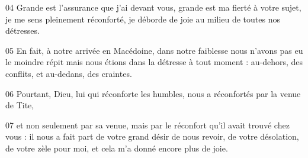 
04 Grande est l’assurance que j’ai devant vous, grande est ma fierté à votre sujet, je me sens pleinement réconforté, je déborde de joie au milieu de toutes nos détresses.

05 En fait, à notre arrivée en Macédoine, dans notre faiblesse nous n’avons pas eu le moindre répit mais nous étions dans la détresse à tout moment : au-dehors, des conflits, et au-dedans, des craintes.

06 Pourtant, Dieu, lui qui réconforte les humbles, nous a réconfortés par la venue de Tite,

07 et non seulement par sa venue, mais par le réconfort qu’il avait trouvé chez vous : il nous a fait part de votre grand désir de nous revoir, de votre désolation, de votre zèle pour moi, et cela m’a donné encore plus de joie.
